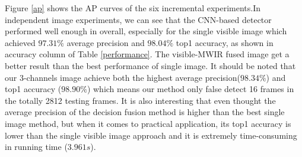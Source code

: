 \documentclass[journal]{IEEEtran}
\begin{document}
\begin{table}[thp]
\caption{Performance comparison on accuracy and time cost of different methods.}
\centering
{}

\label{performance}
\end{table}
Figure \ref{ap} shows the AP curves of the six incremental experiments.In independent image experiments, we can see that the CNN-based detector performed well enough in overall, especially for the single visible image which achieved $97.31\%$ average precision and $98.04\%$ top1 accuracy, as shown in accuracy column of Table  \ref{performance}. The visible-MWIR fused image get a better result than the best performance of single image. It should be noted that our 3-channels image achieve both the highest average precision($98.34\%$) and top1 accuracy ($98.90\%$) which means our method only false detect 16 frames in the totally 2812 testing frames. It is also interesting that even thought the average precision of the decision fusion method is higher than the best single image method, but when it comes to practical application, its top1 accuracy is lower than the single visible image approach and it is extremely time-consuming in running time ($3.961s$).
\end{document}
